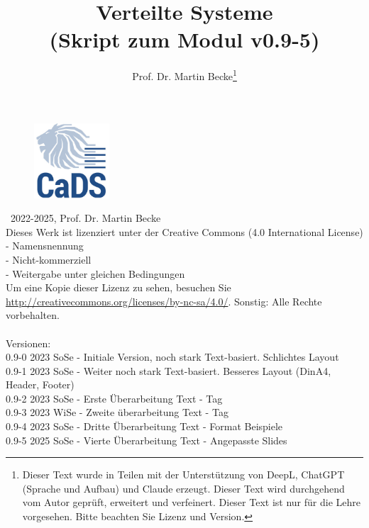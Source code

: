 \documentclass[a4paper,10pt]{book}
\title{Verteilte Systeme\\ (Skript zum Modul v0.9-5)}
\author{Prof. Dr. Martin Becke\footnote{Dieser Text wurde in Teilen mit der Unterstützung von DeepL, ChatGPT (Sprache und Aufbau) und Claude erzeugt. Dieser Text{} wird durchgehend vom Autor geprüft, erweitert und verfeinert. Dieser Text ist nur für die Lehre vorgesehen. Bitte beachten Sie Lizenz und Version.}}
\begin{document}
\maketitle
\vspace*{\fill} %
\begin{figure}[h]
  \centering
  \includegraphics[width=0.25\textwidth]{fig/graphics/CADS_Logo_Quadrat_300x300_RGB_72dpi.jpg} %
\end{figure}
\vspace*{\fill}

\newpage

\noindent
\textcopyright\ 2022-2025, Prof. Dr. Martin Becke\\
Dieses Werk ist lizenziert unter der Creative Commons (4.0 International License)\\
- Namensnennung\\ - Nicht-kommerziell\\ - Weitergabe unter gleichen Bedingungen \\Um eine Kopie dieser Lizenz zu sehen, besuchen Sie\\ \url{http://creativecommons.org/licenses/by-nc-sa/4.0/}. 
Sonstig: Alle Rechte vorbehalten.
\noindent
\\\\
Versionen:\\
0.9-0 2023 SoSe - Initiale Version, noch stark Text-basiert. Schlichtes Layout\\
0.9-1 2023 SoSe - Weiter noch stark Text-basiert. Besseres Layout (DinA4, Header, Footer)\\
0.9-2 2023 SoSe - Erste Überarbeitung Text - Tag\\
0.9-3 2023 WiSe - Zweite überarbeitung Text - Tag \\
0.9-4 2023 SoSe - Dritte Überarbeitung Text - Format Beispiele\\
0.9-5 2025 SoSe - Vierte Überarbeitung Text - Angepasste Slides\\
\end{document}
